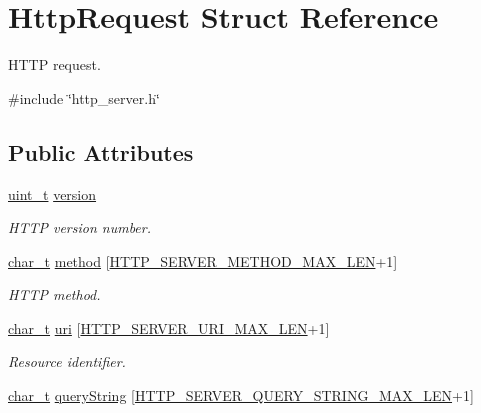 \hypertarget{structHttpRequest}{}\section{Http\+Request Struct Reference}
\label{structHttpRequest}


H\+T\+TP request.  




{\ttfamily \#include \char`\"{}http\+\_\+server.\+h\char`\"{}}

\subsection*{Public Attributes}
\begin{DoxyCompactItemize}
\item 
\hyperlink{compiler__port_8h_a12a1e9b3ce141648783a82445d02b58d}{uint\+\_\+t} \hyperlink{structHttpRequest_a567b3f16eede34c4f3a2f926688445ad}{version}
\begin{DoxyCompactList}\small\item\em H\+T\+TP version number. \end{DoxyCompactList}\item 
\hyperlink{compiler__port_8h_a40bb5262bf908c328fbcfbe5d29d0201}{char\+\_\+t} \hyperlink{structHttpRequest_a66c9d190f2a6cbce14cd1eec6ab7f19d}{method} \mbox{[}\hyperlink{http__server_8h_a34523e60668c177e7019c01fcc6feacf}{H\+T\+T\+P\+\_\+\+S\+E\+R\+V\+E\+R\+\_\+\+M\+E\+T\+H\+O\+D\+\_\+\+M\+A\+X\+\_\+\+L\+EN}+1\mbox{]}
\begin{DoxyCompactList}\small\item\em H\+T\+TP method. \end{DoxyCompactList}\item 
\hyperlink{compiler__port_8h_a40bb5262bf908c328fbcfbe5d29d0201}{char\+\_\+t} \hyperlink{structHttpRequest_adc115cd5bdbed3c91bff676af17fd8dc}{uri} \mbox{[}\hyperlink{http__server_8h_aad636f905c4ba1aa4f135adbada5a70b}{H\+T\+T\+P\+\_\+\+S\+E\+R\+V\+E\+R\+\_\+\+U\+R\+I\+\_\+\+M\+A\+X\+\_\+\+L\+EN}+1\mbox{]}
\begin{DoxyCompactList}\small\item\em Resource identifier. \end{DoxyCompactList}\item 
\hyperlink{compiler__port_8h_a40bb5262bf908c328fbcfbe5d29d0201}{char\+\_\+t} \hyperlink{structHttpRequest_ab298eaa4afb86533f4559824cb615624}{query\+String} \mbox{[}\hyperlink{http__server_8h_af206292720529e388faffbf1955fa0eb}{H\+T\+T\+P\+\_\+\+S\+E\+R\+V\+E\+R\+\_\+\+Q\+U\+E\+R\+Y\+\_\+\+S\+T\+R\+I\+N\+G\+\_\+\+M\+A\+X\+\_\+\+L\+EN}+1\mbox{]}

\end{DoxyCompactItemize}
